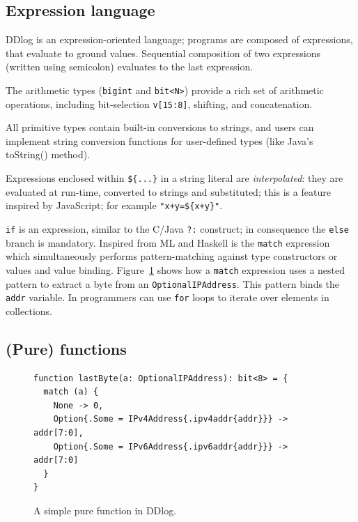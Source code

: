 \subsection{Expression language}

DDlog is an expression-oriented language; programs are composed of
expressions, that evaluate to ground values.  Sequential composition
of two expressions (written using semicolon) evaluates to the last
expression.

The arithmetic types (\texttt{bigint} and \texttt{bit<N>}) provide a
rich set of arithmetic operations, including bit-selection
\texttt{v[15:8]}, shifting, and concatenation.

All primitive types contain built-in conversions to strings, and users
can implement string conversion functions for user-defined types
(like Java's toString() method).

Expressions enclosed within \texttt{\$\{...\}} in a string literal are
\emph{interpolated}: they are evaluated at run-time, converted to
strings and substituted; this is a feature inspired by JavaScript; for
example \texttt{"x+y=\$\{x+y\}"}.

\texttt{if} is an expression, similar to the C/Java \texttt{?:}
construct; in consequence the \texttt{else} branch is mandatory.
Inspired from ML and Haskell is the \texttt{match} expression which
simultaneously performs pattern-matching against type constructors or
values and value binding.  Figure~\ref{fig:function} shows how a
\texttt{match} expression uses a nested pattern to extract a byte from
an \texttt{OptionalIPAddress}.  This pattern binds the \texttt{addr}
variable.  In programmers can use \texttt{for} loops to iterate
over elements in collections.  

\subsection{(Pure) functions}

\begin{figure}[t]
  \small
  \begin{lstlisting}[language=ddlog]
function lastByte(a: OptionalIPAddress): bit<8> = {
  match (a) {
    None -> 0,
    Option{.Some = IPv4Address{.ipv4addr{addr}}} -> addr[7:0],
    Option{.Some = IPv6Address{.ipv6addr{addr}}} -> addr[7:0]
  }
}      
  \end{lstlisting}
  \caption{A simple pure function in DDlog.\label{fig:function}}
\end{figure}

